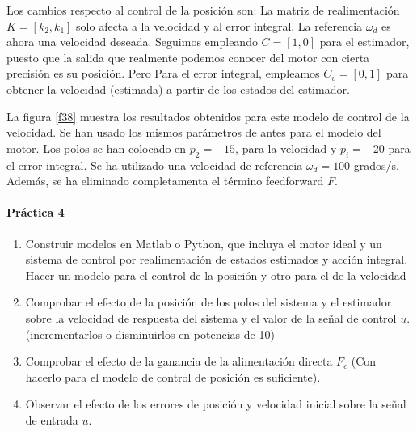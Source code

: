 \documentclass[10pt,a4paper]{report}
\begin{document}
Los cambios respecto al control de la posición son:
La matriz de realimentación $K =[k_2,k_1]$ solo afecta a la velocidad y al error integral. La referencia $\omega_d$ es ahora una velocidad deseada. Seguimos empleando $C = [1,0]$ para el estimador, puesto que la salida que realmente podemos conocer del motor con cierta precisión es su posición. Pero Para el error integral, empleamos $C_v = [0,1]$ para obtener la velocidad (estimada) a partir de los estados del estimador.

La figura \ref{f38} muestra los resultados obtenidos para este modelo de control de la velocidad. Se han usado los mismos parámetros de antes para el modelo del motor. Los polos se han colocado en $p_2 = -15$, para la velocidad y $p_i = -20$ para el error integral. Se ha utilizado una velocidad de referencia $\omega_d = 100$ grados/s. Además, se ha eliminado completamenta el término feedforward $F$.

\paragraph{Práctica 4}
\begin{enumerate}
\item Construir  modelos en Matlab o Python, que incluya el motor ideal y un sistema de control por realimentación de estados estimados y acción integral. Hacer un modelo para el control de la posición y otro para el de la velocidad 
\item Comprobar el efecto de la posición de los polos del sistema y el estimador sobre la velocidad de respuesta del sistema y el valor de la señal de control $u$. (incrementarlos o disminuirlos en potencias de 10)
\item Comprobar el efecto de la ganancia de la alimentación directa $F_c$ (Con hacerlo para el modelo de control de posición es suficiente).
\item Observar el efecto de los errores de posición y velocidad inicial sobre la señal de entrada $u$. 
\end{enumerate}
\end{document}
